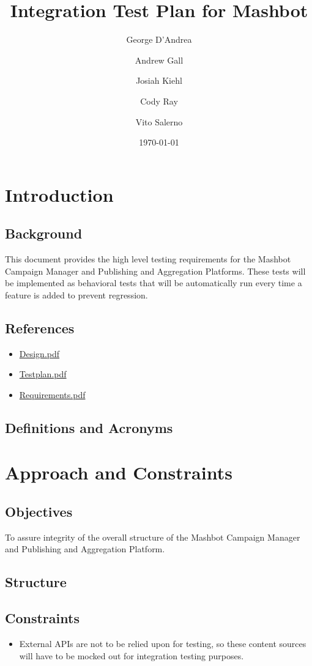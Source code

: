 \documentclass[12pt]{article}
\title{Integration Test Plan for Mashbot}
\author{George D'Andrea \and Andrew Gall \and Josiah Kiehl \and
  Cody Ray \and Vito Salerno}
\date{\today}
\begin{document}
\maketitle

\section{Introduction}
\subsection{Background}
This document provides the high level testing requirements for the Mashbot Campaign Manager and Publishing and Aggregation Platforms.  These tests will be implemented as behavioral tests that will be automatically run every time a feature is added to prevent regression.
\subsection{References}
\begin{itemize}
\item \href{http://mashbot.heroku.com/doc/Design.pdf}{Design.pdf}
\item \href{http://mashbot.heroku.com/doc/Testplan.pdf}{Testplan.pdf}
\item \href{http://mashbot.heroku.com/doc/Requirements.pdf}{Requirements.pdf}
\end{itemize}
\subsection{Definitions and Acronyms}

\section{Approach and Constraints}
\subsection{Objectives}
To assure integrity of the overall structure of the Mashbot Campaign Manager and Publishing and Aggregation Platform.
\subsection{Structure}

\subsection{Constraints}
\begin{itemize}
\item External APIs are not to be relied upon for testing, so these content sources will have to be mocked out for integration testing purposes.
\end{itemize}
\end{document}
